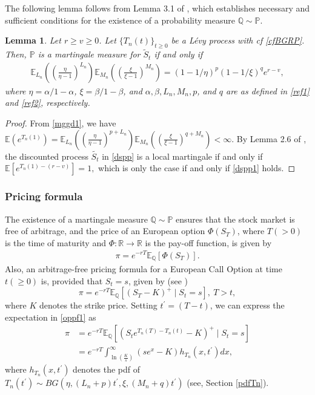 \documentclass[12pt, a4paper,reqno]{amsart}
\newtheorem{lem}[thm]{Lemma}
\theoremstyle{definition}
\theoremstyle{myremark}
\numberwithin{equation}{section}
\begin{document}
\noindent
The following lemma follows from Lemma 3.1 of \cite{bilateral2}, which establishes necessary and sufficient conditions for the existence of a probability measure $\mathbb{Q} \sim \mathbb{P}$.
\vspace{-.5cm}
\begin{lem}
Let $r\geq v \geq 0$. Let $\{T_n(t)\}_{t\geq 0}$ be a L\'evy process with cf \eqref{cfBGRP}. Then, $\mathbb{P}$ is a martingale measure for $\tilde{S}_t$ if and only if 
\begin{align}\label{dspp1}
\mathbb{E}_{L_n} \left(\left(\frac{\eta}{\eta-1}\right)^{L_n}  \right) \mathbb{E}_{M_n} \left(\left(\frac{\xi}{\xi-1}\right)^{M_n}  \right)=(1-1/\eta)^p (1-1/\xi)^q e^{r-v},
\end{align}
where $\eta=\alpha/1-\alpha$, $\xi=\beta/1-\beta$, and $\alpha,\beta,L_n,M_n,p$, and $q$ are as defined in \eqref{ref1} and \eqref{ref2}, respectively.
\end{lem}
\vspace{-.8cm}
\begin{proof}
	From \eqref{mggd1}, we have $\mathbb{E}(e^{T_n(1)})=\mathbb{E}_{L_n} \left(\left(\frac{\eta}{\eta-1}\right)^{p+L_n}  \right) \mathbb{E}_{M_n} \left(\left(\frac{\xi}{\xi-1}\right)^{q+M_n}  \right)<\infty$. By Lemma 2.6 of \cite{bilateral2}, the discounted process $\tilde{S_t}$ in \eqref{dspp} is a local martingale if and only if $\mathbb{E}[e^{T_n(1)-(r-v)}]=1,$ which is only the case if and only if \eqref{dspp1} holds.
\end{proof}
\vspace{-.46cm}
\subsubsection{Pricing formula}
The existence of a martingale measure $\mathbb{Q} \sim \mathbb{P}$ ensures that the stock market is free of arbitrage, and the price of an European option $\Phi(S_T )$, where $T( > 0)$ is the time of maturity and $\Phi : \mathbb{R}\to \mathbb{R}$ is the pay-off function, is given by
\begin{align}
\pi=e^{-rT}\mathbb{E}_{\mathbb{Q}}[\Phi(S_T)].
\end{align}
\noindent
Also, an arbitrage-free pricing formula for a European Call Option at time $t (\ge 0)$ is, provided that $S_t = s$, given by (see \cite{bilateral0})
\begin{equation}\label{oppf1}
\pi = e^{-rT}\mathbb{E}_{\mathbb{Q}}\left[(S_T - K)^+ \mid S_t = s\right], ~T>t,
\end{equation}
where $K$ denotes the strike price. Setting $t^\prime=(T-t)$, we can express the expectation in \eqref{oppf1} as
\begin{align}\label{pf1}
\nonumber\pi&=e^{-rT}\mathbb{E}_{\mathbb{Q}}\left[(S_t e^{T_n(T)-T_n(t)} - K)^+ \mid S_t = s\right]\\
&= e^{-rT} \int_{\ln\left(\frac{K}{s}\right)}^{\infty} 
(se^x - K) h_{T_n}(x,t^\prime) dx,
\end{align}  
\noindent
where $h_{T_n}(x,t^\prime)$ denotes the pdf of $T_n(t^\prime) \sim BG \left(\eta, (L_n+p)t^\prime,\xi,(M_n+q)t^\prime \right)$ (see, Section \ref{pdfTn}). 
\end{document}
